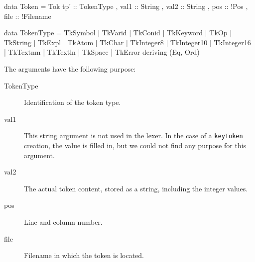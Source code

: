 \begin{haskell}
data Token = Tok { tp' :: TokenType
                 , val1 :: String
                 , val2 :: String
                 , pos :: !Pos
                 , file :: !Filename
                 }

data TokenType
  = TkSymbol
  | TkVarid
  | TkConid
  | TkKeyword
  | TkOp
  | TkString
  | TkExpl
  | TkAtom
  | TkChar
  | TkInteger8
  | TkInteger10
  | TkInteger16
  | TkTextnm
  | TkTextln
  | TkSpace
  | TkError
  deriving (Eq, Ord)
\end{haskell}
%
The arguments have the following purpose:
\begin{description}
  \item[TokenType]
    Identification of the token type. %
  \item[val1]
    This string argument is not used in the lexer.
    In the case of a \texttt{keyToken} creation, the value is filled in, but we could not find any purpose for this argument.
  \item[val2]
    The actual token content, stored as a string, including the integer values.
  \item[pos]
    Line and column number.
  \item[file]
     Filename in which the token is located.
\end{description}
